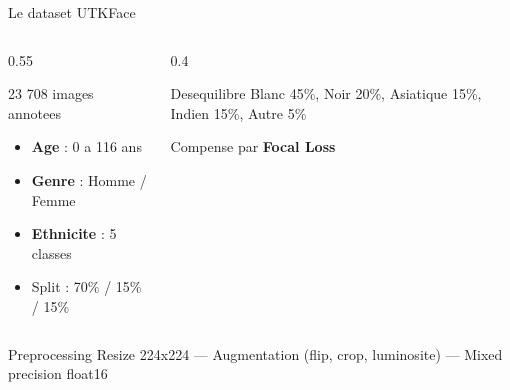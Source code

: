 \documentclass[aspectratio=169, 12pt]{beamer}
\begin{document}
\begin{frame}{Le dataset UTKFace}

\begin{columns}[T]
\begin{column}{0.55\textwidth}
\begin{block}{23 708 images annotees}
\begin{itemize}
    \item \textbf{Age} : 0 a 116 ans
    \item \textbf{Genre} : Homme / Femme
    \item \textbf{Ethnicite} : 5 classes
    \item Split : 70\% / 15\% / 15\%
\end{itemize}
\end{block}
\end{column}

\begin{column}{0.4\textwidth}
\begin{alertblock}{Desequilibre}
{\small Blanc 45\%, Noir 20\%, Asiatique 15\%, Indien 15\%, Autre 5\%}

\vspace{0.1cm}
Compense par \textbf{Focal Loss}
\end{alertblock}
\end{column}
\end{columns}

\vspace{0.2cm}
\begin{exampleblock}{Preprocessing}
{\small Resize 224x224 --- Augmentation (flip, crop, luminosite) --- Mixed precision float16}
\end{exampleblock}
\end{frame}
\end{document}
